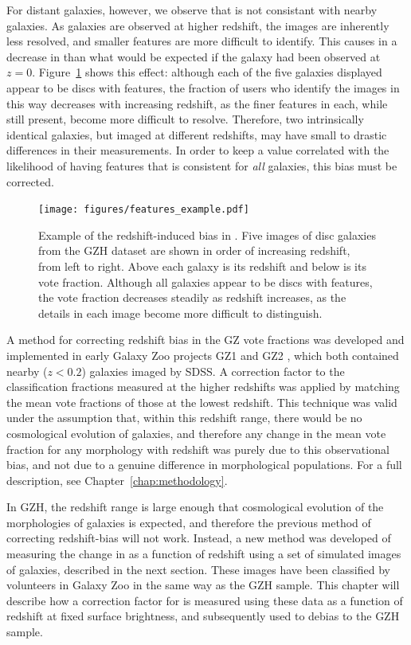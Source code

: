For distant galaxies, however, we observe that \ffeatures{} is not consistant with nearby galaxies. As galaxies are observed at higher redshift, the images are inherently less resolved, and smaller features are more difficult to identify. This causes in a decrease in \ffeatures{} than what would be expected if the galaxy had been observed at $z=0$. Figure~\ref{fig:features_example} shows this effect: although each of the five galaxies displayed appear to be discs with features, the fraction of users who identify the images in this way decreases with increasing redshift, as the finer features in each, while still present, become more difficult to resolve. Therefore, two intrinsically identical galaxies, but imaged at different redshifts, may have small to drastic differences in their \ffeatures{} measurements. In order to keep \ffeatures{} a value correlated with the likelihood of having features that is consistent for \emph{all} galaxies, this bias must be corrected.

\begin{figure}
\centering
\texttt{[image: figures/features\_example.pdf]}
\label{fig:features_example}
\caption{Example of the redshift-induced bias in \ffeatures{}. Five images of disc galaxies from the GZH dataset are shown in order of increasing redshift, from left to right. Above each galaxy is its redshift and below is its \ffeatures{} vote fraction. Although all galaxies appear to be discs with features, the vote fraction decreases steadily as redshift increases, as the details in each image become more difficult to distinguish.}
\end{figure} 

A method for correcting redshift bias in the GZ vote fractions was developed and implemented in early Galaxy Zoo projects GZ1 \citep{Lintott2009} and GZ2 \citep{Willett2013}, which both contained nearby ($z<0.2$) galaxies imaged by SDSS. A correction factor to the classification fractions measured at the higher redshifts was applied by matching the mean vote fractions of those at the lowest redshift. This technique was valid under the assumption that, within this redshift range, there would be no cosmological evolution of galaxies, and therefore any change in the mean vote fraction for any morphology with redshift was purely due to this observational bias, and not due to a genuine difference in morphological populations. For a full description, see Chapter~\ref{chap:methodology}. 

In GZH, the redshift range is large enough that cosmological evolution of the morphologies of galaxies is expected, and therefore the previous method of correcting redshift-bias will not work. Instead, a new method was developed of measuring the change in \ffeatures{} as a function of redshift using a set of simulated \ferengi{} images of galaxies, described in the next section. These images have been classified by volunteers in Galaxy Zoo in the same way as the GZH sample. This chapter will describe how a correction factor for \ffeatures{} is measured using these data as a function of redshift at fixed surface brightness, and subsequently used to debias to the GZH sample. 

